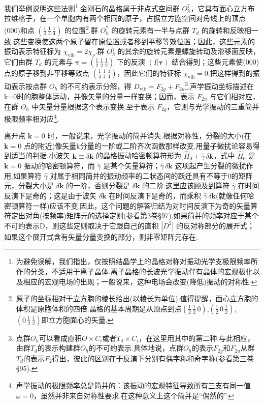 我们举例说明这些法则\footnote{为避免误解，我们指出，仅按照结晶学上的晶格对称对振动光学支极限频率所作的分类，不适用于离子晶体.离子晶格的长波光学振动伴有晶体的宏观极化以及相应的宏观电场的出现；一般说来，这种电场会改变(降低)振动的对称性.}.金刚石的晶格属于非点式空间群 $O_h^7$，它具有面心立方布拉维格子，在一个单胞内有两个相同的原子，占据立方胞空间对角线上的顶点(000)和点 $(\frac{1}{4}\,\frac{1}{4}\,\frac{1}{4})$ 的位置\footnote{原子的坐标相对于立方胞的棱长给出(以棱长为单位).值得提醒，面心立方胞的体积是原胞体积的四倍.晶格的基本周期是从顶点到点$\left(\frac{1}{2}\,\frac{1}{2}\,0\right)$,$\left(\frac{1}{2}\,0\,\frac{1}{2}\right)$,$\left(0\,\frac{1}{2}\,\frac{1}{2}\right)$即立方胞面心的矢量.}.群 $O_h^7$ 的旋转元素有一半与点群 $T_d$ 的旋转和反映相一致.这些变换使这两个原子留在原位置或者移到平移等效位置；因此，这些元素的振动表示特征标为 $\chi_{\mathrm{vib}}=2\chi_\nu$.群 $O_h^7$ 的其余的旋转元素是螺旋转动及滑移面反映，它们由群 $T_d$ 的元素与 $\boldsymbol{\tau}=(\frac{1}{2}\,\frac{1}{2}\,\frac{1}{2})$ 下的反演 $(I|\boldsymbol{\tau})$ 结合得到；这些元素使(000)点的原子移到非平移等效点 $(\frac{1}{4}\,\frac{1}{4}\,\frac{1}{4})$，因此它们的特征标 $\chi_{\mathrm{vib}}=0$.把这样得到的振动表示按点群 $O_h$ 的不可约表示分解，得 $D_{\mathrm{vib}}=F_{2g}+F_{2u}$\footnote{点群$O_h$可以看成直积$O\times C_i$或者$T_d\times C_i$，在这里用其中的第二种.与此相应，由群$T_d$的表示构建群$O_h$的不可约表示.具体地说，点群$O_h$的表示$F_{2g}$和$F_{2u}$从群$T_d$的表示$F_2$得出，彼此的区别在于反演下分别有偶字称和奇字称(参看第三卷§95).}.声学振动坐标描述在k=0时的胞整体运动，并像矢量的分量一样变换；因而，表示 $F_{2u}$ 与它们相对应，在群 $O_h$ 中矢量分量根据这个表示变换.至于表示 $F_{2g}$，它则与光学振动的三重简并极限频率相对应\footnote{声学振动的极限频率总是简并的：该振动的宏观特征导致所有三支有同一值$\omega=0$，虽然并非来自对称性要求.在这种意义上这个简并是“偶然的”.}.

离开点 $\boldsymbol{k}=0$ 时，一般说来，光学振动的简并消失.根据对称性，分裂的大小(在 $\boldsymbol{k}=0$ 点的附近)像矢量k分量的一阶或二阶齐次函数那样改变.用量子微扰论容易得到适当的判据.小波矢 $\boldsymbol{k}\equiv\delta\boldsymbol{k}$ 的晶格振动哈密顿算符形为 $\hat H_0+\hat\gamma\,\delta\boldsymbol{k}$，式中 $\hat H_0$ 是 $\boldsymbol{k}=0$ 振动的哈密顿算符，而 $\hat\gamma$ 是某个矢量算符；$\hat\gamma\,\delta\boldsymbol{k}$ 这项起产生分裂的微扰作用.如果算符 $\hat\gamma$ 对属于相同简并的振动频率的二状态间的跃迁具有不等于0的矩阵元，分裂大小是 $\delta\boldsymbol{k}$ 的一阶，否则分裂是 $\delta\boldsymbol{k}$ 的二阶.这里应该顾及到算符 $\hat\gamma$ 在时间反演下是奇的；这是由于波矢 $\delta\boldsymbol{k}$ 在时间反演下是奇的，而乘积 $\hat\gamma\,\delta\boldsymbol{k}$(就像任何哈密顿算符一样)应该不变.因此，这个问题的解答归结为对时间反演下为奇的矢量算符定出对角(按频率)矩阵元的选择定则(参看第3卷§97).如果简并的频率对应于某个不可约表示D，则这些定则取决于它跟自己的直积 $|D^2|$ 的反对称部分的展开式；如果这个展开式含有矢量分量变换的部分，则非零矩阵元存在.

